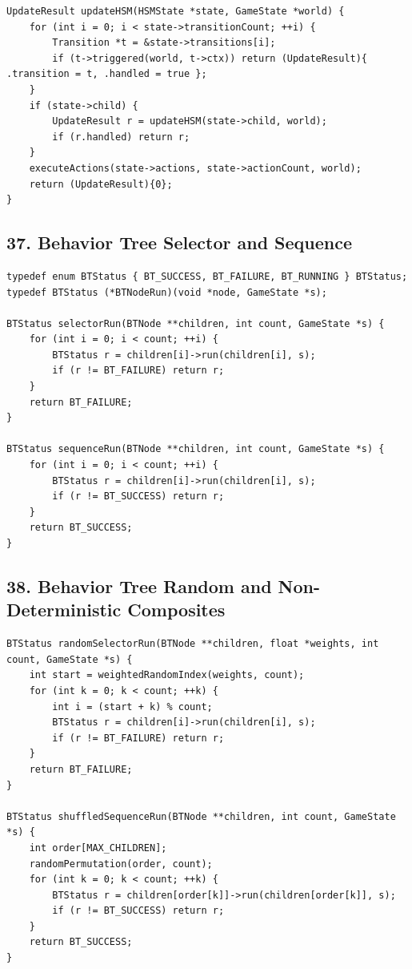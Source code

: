 \documentclass[10pt,letterpaper]{article}
\begin{document}
\begin{verbatim}
UpdateResult updateHSM(HSMState *state, GameState *world) {
    for (int i = 0; i < state->transitionCount; ++i) {
        Transition *t = &state->transitions[i];
        if (t->triggered(world, t->ctx)) return (UpdateResult){ .transition = t, .handled = true };
    }
    if (state->child) {
        UpdateResult r = updateHSM(state->child, world);
        if (r.handled) return r;
    }
    executeActions(state->actions, state->actionCount, world);
    return (UpdateResult){0};
}
\end{verbatim}

\subsection*{37. Behavior Tree Selector and Sequence}
{}

\begin{verbatim}
typedef enum BTStatus { BT_SUCCESS, BT_FAILURE, BT_RUNNING } BTStatus;
typedef BTStatus (*BTNodeRun)(void *node, GameState *s);

BTStatus selectorRun(BTNode **children, int count, GameState *s) {
    for (int i = 0; i < count; ++i) {
        BTStatus r = children[i]->run(children[i], s);
        if (r != BT_FAILURE) return r;
    }
    return BT_FAILURE;
}

BTStatus sequenceRun(BTNode **children, int count, GameState *s) {
    for (int i = 0; i < count; ++i) {
        BTStatus r = children[i]->run(children[i], s);
        if (r != BT_SUCCESS) return r;
    }
    return BT_SUCCESS;
}
\end{verbatim}

\subsection*{38. Behavior Tree Random and Non-Deterministic Composites}
{}

\begin{verbatim}
BTStatus randomSelectorRun(BTNode **children, float *weights, int count, GameState *s) {
    int start = weightedRandomIndex(weights, count);
    for (int k = 0; k < count; ++k) {
        int i = (start + k) % count;
        BTStatus r = children[i]->run(children[i], s);
        if (r != BT_FAILURE) return r;
    }
    return BT_FAILURE;
}

BTStatus shuffledSequenceRun(BTNode **children, int count, GameState *s) {
    int order[MAX_CHILDREN];
    randomPermutation(order, count);
    for (int k = 0; k < count; ++k) {
        BTStatus r = children[order[k]]->run(children[order[k]], s);
        if (r != BT_SUCCESS) return r;
    }
    return BT_SUCCESS;
}
\end{verbatim}
\end{document}
